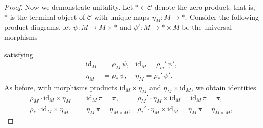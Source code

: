 \documentclass[ 12pt ]{article}
\begin{document}
\begin{enumerate}
\begin{proof}
			Now we demonstrate unitality. Let $\ast \in \mathscr{C}$ denote the zero product; that is, $\ast$ is the terminal object of $\mathscr{C}$ with unique maps $\eta_M : M \to \ast$. Consider the following product diagrams, let $\psi : M \to M \times \ast$ and $\psi' : M \to \ast \times M$ be the universal morphisms
			\begin{center}
			\end{center}
			satisfying
			\begin{align*}
				\mathrm{id}_M &= \rho_M\, \psi, & \mathrm{id}_M = \rho_m'\, \psi', \\
				\eta_M &= \rho_\ast\, \psi, & \eta_M = \rho_\ast'\, \psi'.
			\end{align*}
			As before, with morphisms products $\mathrm{id}_M \times \eta_M$ and $\eta_M \times \mathrm{id}_M$, we obtain identities
			\begin{align*}
				\rho_M \cdot \mathrm{id}_M \times \eta_M &= \mathrm{id}_M\, \pi = \pi, & \rho_M' \cdot \eta_M \times \mathrm{id}_M = \mathrm{id}_M\, \pi = \pi, \\
				\rho_\ast \cdot \mathrm{id}_M \times \eta_M &= \eta_M\, \pi = \eta_{M \times M}, & \rho_\ast' \cdot \eta_M \times \mathrm{id}_M = \eta_M\, \pi = \eta_{M \times M},
			\end{align*}

\end{proof}
\end{enumerate}
\end{document}
